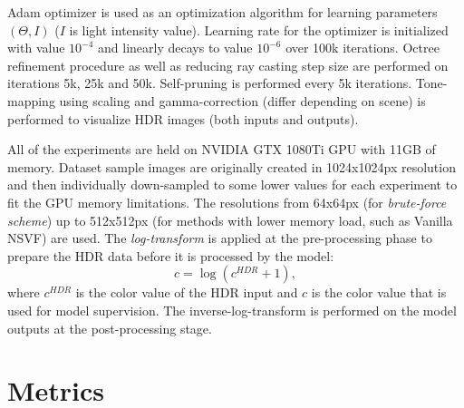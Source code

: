 Adam optimizer is used as an optimization algorithm for learning parameters $(\Theta, I)$ ($I$ is light intensity value).
Learning rate for the optimizer is initialized with value $10^{-4}$
and linearly decays to value $10^{-6}$ over 100k iterations.
Octree refinement procedure as well as reducing ray casting step size are performed on iterations 5k, 25k and 50k.
Self-pruning is performed every 5k iterations.
Tone-mapping using scaling and gamma-correction (differ depending on scene)
is performed to visualize HDR images (both inputs and outputs).

All of the experiments are held on NVIDIA GTX 1080Ti GPU with 11GB of memory.
Dataset sample images are originally created in 1024x1024px resolution
and then individually down-sampled to some lower values for each experiment to fit the GPU memory limitations.
The resolutions from 64x64px (for \textit{brute-force scheme}) up to 512x512px 
(for methods with lower memory load, such as Vanilla NSVF) are used.
The \textit{log-transform} is applied at the pre-processing phase
to prepare the HDR data before it is processed by the model:
\begin{equation}
    c = \log (c^{HDR} + 1),
\end{equation}
where $c^{HDR}$ is the color value of the HDR input
and $c$ is the color value that is used for model supervision.
The inverse-log-transform is performed on the model outputs at the post-processing stage.









\section{Metrics}
\label{sec:metrics}

